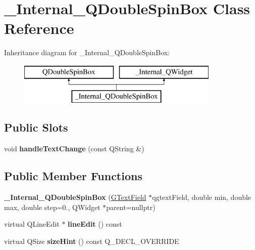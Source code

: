 \hypertarget{class__Internal__QDoubleSpinBox}{}\section{\+\_\+\+Internal\+\_\+\+Q\+Double\+Spin\+Box Class Reference}
\label{class__Internal__QDoubleSpinBox}
Inheritance diagram for \+\_\+\+Internal\+\_\+\+Q\+Double\+Spin\+Box\+:\begin{figure}[H]
\begin{center}
\leavevmode
\includegraphics[height=2.000000cm]{class__Internal__QDoubleSpinBox}
\end{center}
\end{figure}
\subsection*{Public Slots}
\begin{DoxyCompactItemize}
\item 
\mbox{\label{class__Internal__QDoubleSpinBox_a1f172bad21cf1dbefcfd89b787abf547}} 
void {\bfseries handle\+Text\+Change} (const Q\+String \&)
\end{DoxyCompactItemize}
\subsection*{Public Member Functions}
\begin{DoxyCompactItemize}
\item 
\mbox{\label{class__Internal__QDoubleSpinBox_a1ebe718fd1b792916e48df72e6794607}} 
{\bfseries \+\_\+\+Internal\+\_\+\+Q\+Double\+Spin\+Box} (\mbox{\hyperlink{classGTextField}{G\+Text\+Field}} $\ast$qgtext\+Field, double min, double max, double step=0., Q\+Widget $\ast$parent=nullptr)
\item 
\mbox{\label{class__Internal__QDoubleSpinBox_a8121409dbdf939716f87b8ade98ace48}} 
virtual Q\+Line\+Edit $\ast$ {\bfseries line\+Edit} () const
\item 
\mbox{\label{class__Internal__QDoubleSpinBox_a22de2ffc78c075e1ca34ce9475bbe2c5}} 
virtual Q\+Size {\bfseries size\+Hint} () const Q\+\_\+\+D\+E\+C\+L\+\_\+\+O\+V\+E\+R\+R\+I\+DE
\end{DoxyCompactItemize}


